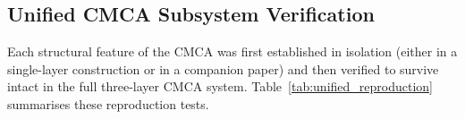 \documentclass[11pt]{article}
\theoremstyle{remark}
\begin{document}
\begin{appendices}
\section{Unified CMCA Subsystem Verification}
\label{app:unification}

Each structural feature of the CMCA was first established in isolation
(either in a single-layer construction or in a companion paper) and then
verified to survive intact in the full three-layer CMCA system.
Table~\ref{tab:unified_reproduction} summarises these reproduction tests.


\end{appendices}
\end{document}
